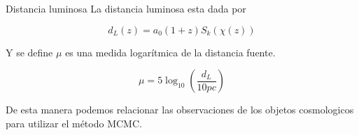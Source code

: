 \documentclass[10pt]{beamer}
\begin{document}
\begin{frame}{Distancia luminosa}
La distancia luminosa esta dada por 

\begin{equation}
d_L(z) = a_0(1+z)S_k(\chi(z))
\end{equation}

Y se define $\mu$  es una medida logarítmica de la distancia fuente.

\begin{equation}
\mu = 5\log_{10}\left(\frac{d_L}{10pc}\right)
\end{equation}

De esta manera podemos relacionar las observaciones de los objetos cosmologicos para utilizar el método MCMC.

\end{frame}
\end{document}
